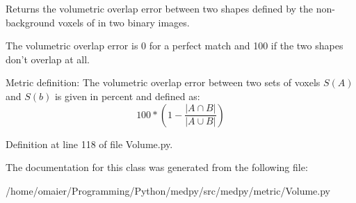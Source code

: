 Returns the volumetric overlap error between two shapes defined by the non-\/background voxels of in two binary images. 

The volumetric overlap error is 0 for a perfect match and 100 if the two shapes don't overlap at all.

Metric definition: The volumetric overlap error between two sets of voxels $S(A)$ and $S(b)$ is given in percent and defined as: \[ 100 * \left( 1 - \frac{|A\cap B|}{|A\cup B|} \right) \] 

Definition at line 118 of file Volume.py.



The documentation for this class was generated from the following file:\begin{DoxyCompactItemize}
\item 
/home/omaier/Programming/Python/medpy/src/medpy/metric/Volume.py\end{DoxyCompactItemize}
